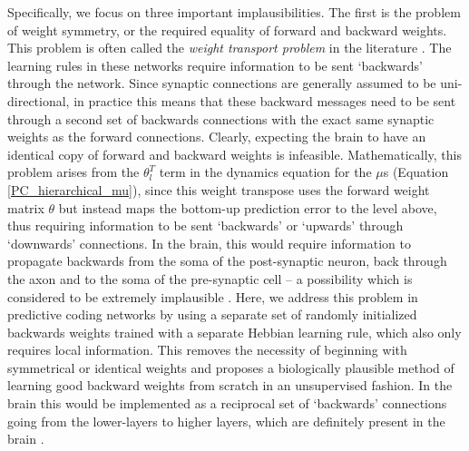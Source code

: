 Specifically, we focus on three important implausibilities. The first is the problem of weight symmetry, or the required equality of forward and backward weights. This problem is often called the \emph{weight transport problem} in the literature \citep{lillicrap2016random,crick1989recent,lillicrap2020backpropagation}. The learning rules in these networks require information to be sent `backwards' through the network. Since synaptic connections are generally assumed to be uni-directional, in practice this means that these backward messages need to be sent through a second set of backwards connections with the exact same synaptic weights as the forward connections. Clearly, expecting the brain to have an identical copy of forward and backward weights is infeasible. Mathematically, this problem arises from the $\theta_l^T$ term in the dynamics equation for the $\mu$s (Equation \ref{PC_hierarchical_mu}), since this weight transpose uses the forward weight matrix $\theta$ but instead maps the bottom-up prediction error to the level above, thus requiring information to be sent `backwards' or `upwards' through `downwards' connections. In the brain, this would require information to propagate backwards from the soma of the post-synaptic neuron, back through the axon and to the soma of the pre-synaptic cell -- a possibility which is considered to be extremely implausible \citep{lillicrap2014random}. Here, we address this problem in predictive coding networks by using a separate set of randomly initialized backwards weights trained with a separate Hebbian learning rule, which also only requires local information. This removes the necessity of beginning with symmetrical or identical weights and proposes a biologically plausible method of learning good backward weights from scratch in an unsupervised fashion. In the brain this would be implemented as a reciprocal set of `backwards' connections going from the lower-layers to higher layers, which are definitely present in the brain \citep{grill2004human}.

